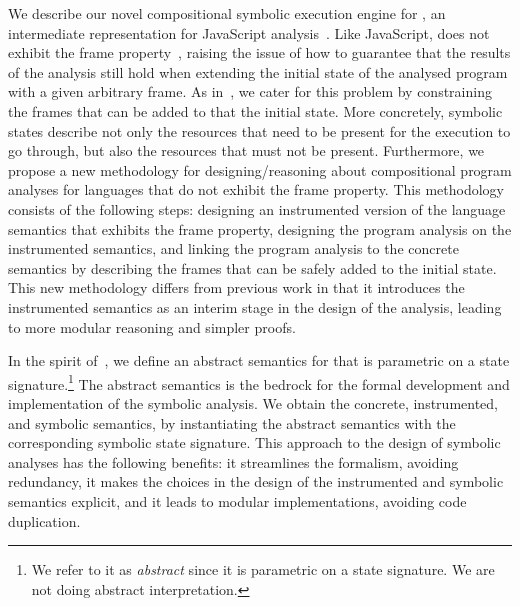 
We describe our novel compositional symbolic execution engine for \jsil, an intermediate
representation for JavaScript analysis~\cite{javert}.
% 
Like JavaScript, \jsil does not exhibit the frame property~\cite{reynolds:lics:2002}, raising 
the issue of how to guarantee that the results of the analysis still hold when extending the 
initial state of the analysed program with a given arbitrary frame.
%
As in~\cite{gardner:popl:2012,javert}, we cater for this problem by constraining the frames 
that can be added to that the initial state. More concretely, symbolic states
describe not only the resources that need to be present for the execution to go through, but
also the resources that must not be present.   
%
Furthermore, we propose a new methodology for designing/reasoning about
compositional program analyses for languages that do not exhibit the frame property. 
This methodology consists of the following steps:  designing an instrumented version
of the language semantics that exhibits the frame property,  designing the program 
analysis on the instrumented semantics, and  linking the program analysis 
to the concrete semantics by describing the frames that can be safely added to the initial 
state.   
%
This new methodology differs from  previous work in that it introduces the 
instrumented semantics as an interim stage in the design of the analysis, 
leading to more modular reasoning and simpler proofs. 

In the spirit of~\cite{vanhorn:icfp:2010}, we define an abstract semantics for \jsil that  
is parametric on a \jsil state signature.\footnote{We refer to it as \emph{abstract} since it 
is parametric on a \jsil state signature. We are not doing abstract interpretation.} 
The abstract semantics is the bedrock 
for the formal development and implementation of the symbolic analysis. We 
obtain the concrete, instrumented, and symbolic semantics, by instantiating 
the abstract semantics with the corresponding symbolic state signature. 
This approach to the design of symbolic analyses has the following benefits: 
 it streamlines the formalism, avoiding redundancy,
 it makes the choices in the design of the instrumented and symbolic semantics explicit,
and  it leads to modular implementations, avoiding code duplication.




